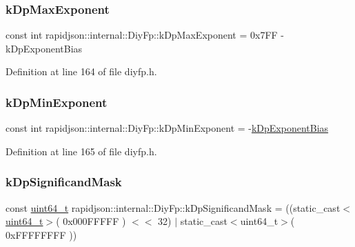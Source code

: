 \subsubsection{\texorpdfstring{kDpMaxExponent}{kDpMaxExponent}}
{\footnotesize\ttfamily const int rapidjson\+::internal\+::\+Diy\+Fp\+::k\+Dp\+Max\+Exponent = 0x7\+F\+F -\/ k\+Dp\+Exponent\+Bias\hspace{0.3cm}{\ttfamily [static]}}



Definition at line 164 of file diyfp.\+h.

\mbox{\label{structrapidjson_1_1internal_1_1_diy_fp_adb36355e6aa6a23da0eff2cc36e5d8c5}} 
\subsubsection{\texorpdfstring{kDpMinExponent}{kDpMinExponent}}
{\footnotesize\ttfamily const int rapidjson\+::internal\+::\+Diy\+Fp\+::k\+Dp\+Min\+Exponent = -\/\mbox{\hyperlink{structrapidjson_1_1internal_1_1_diy_fp_a36911b66284d6c8fd6878857518162ab}{k\+Dp\+Exponent\+Bias}}\hspace{0.3cm}{\ttfamily [static]}}



Definition at line 165 of file diyfp.\+h.

\mbox{\label{structrapidjson_1_1internal_1_1_diy_fp_a2144edfd83e1ed1c91ba25a32f06040c}} 
\subsubsection{\texorpdfstring{kDpSignificandMask}{kDpSignificandMask}}
{\footnotesize\ttfamily const \mbox{\hyperlink{stdint_8h_aec6fcb673ff035718c238c8c9d544c47}{uint64\+\_\+t}} rapidjson\+::internal\+::\+Diy\+Fp\+::k\+Dp\+Significand\+Mask = ((static\+\_\+cast$<$\mbox{\hyperlink{stdint_8h_aec6fcb673ff035718c238c8c9d544c47}{uint64\+\_\+t}}$>$( 0x000\+F\+F\+F\+F\+F ) $<$$<$ 32) $\vert$ static\+\_\+cast$<$uint64\+\_\+t$>$( 0x\+F\+F\+F\+F\+F\+F\+F\+F ))\hspace{0.3cm}{\ttfamily [static]}}



